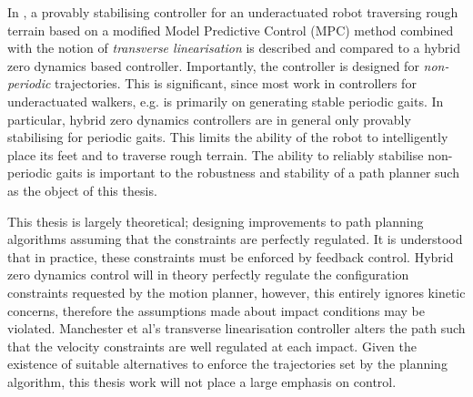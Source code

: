 In \cite{manchester2011stable}, a provably stabilising controller for an underactuated robot traversing rough terrain based on a modified Model Predictive Control (MPC) method combined with the notion of \textit{transverse linearisation} is described and compared to a hybrid zero dynamics based controller. Importantly, the controller is designed for \textit{non-periodic} trajectories. This is significant, since most work in controllers for underactuated walkers, e.g. \cite{martin2014design, sreenath2011compliant, raibert2008bigdog} is primarily on generating stable periodic gaits. In particular, hybrid zero dynamics controllers are in general only provably stabilising for periodic gaits. This limits the ability of the robot to intelligently place its feet and to traverse rough terrain. The ability to reliably stabilise non-periodic gaits is important to the robustness and stability of a path planner such as the object of this thesis. 

This thesis is largely theoretical; designing improvements to path planning algorithms assuming that the constraints are perfectly regulated. It is understood that in practice, these constraints must be enforced by feedback control. Hybrid zero dynamics control will in theory perfectly regulate the configuration constraints requested by the motion planner, however, this entirely ignores kinetic concerns, therefore the assumptions made about impact conditions may be violated. Manchester et al's transverse linearisation controller alters the path such that the velocity constraints are well regulated at each impact. Given the existence of suitable alternatives to enforce the trajectories set by the planning algorithm, this thesis work will not place a large emphasis on control.